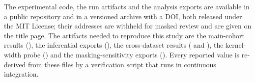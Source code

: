 \documentclass[11pt,a4paper]{article}
\begin{document}
The experimental code, the run artifacts and the analysis exports are
available in a public repository and in a versioned archive with a DOI,
both released under the MIT License; their addresses are withheld for
masked review and are given on the title page. The
artifacts needed to reproduce this study are the main-cohort results
(), the inferential exports
(), the cross-dataset results
( and
), the kernel-width probe
() and the
masking-sensitivity exports
(). Every reported value
is re-derived from these files by a verification script that runs in
continuous integration.
\end{document}

